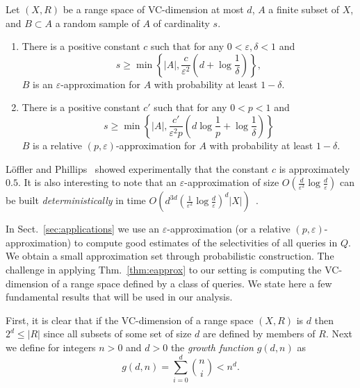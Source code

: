 \begin{theorem}\label{thm:eapprox}
Let $(X,R)$ be a range space of VC-dimension at most $d$,  $A$ a finite subset of $X$, and $B\subset
  A$ a random sample of $A$ of cardinality $s$. 
  \begin{enumerate}
\item
  There is a positive constant $c$ such that for any 
  $0<\varepsilon,\delta<1$  and  
  \begin{equation}\label{eq:eapprox}
  s\ge\min\left\{|A|,\frac{c}{\varepsilon^2}\left(d+\log\frac{1}{\delta}\right)\right\},
  \end{equation}  $B$ is an $\varepsilon$-approximation for $A$ with probability at least $1-\delta$.
\item
There is a positive constant $c'$ such that for any $0<p<1$ and
  $$s\ge\min\left\{|A|,\frac{c'}{\varepsilon^2p}\left(d\log{\frac{1}{p}}+\log\frac{1}{\delta}\right)\right\}$$
  $B$ is a relative
  $(p,\varepsilon)$-approximation for $A$ with probability at least $1-\delta$.
  \end{enumerate}
\end{theorem}

L\"offler and Phillips~\citeyearpar{LofflerP09} showed experimentally that the constant
$c$ is approximately $0.5$. It is also interesting to note that an
$\varepsilon$-approximation of size
$O(\frac{d}{\varepsilon^2}\log{\frac{d}{\varepsilon}})$ can be built
\emph{deterministically} in time
$O(d^{3d}(\frac{1}{\varepsilon^2}\log{\frac{d}{\varepsilon}})^d|X|)$~\citep{Chazelle00}.

In Sect.~\ref{sec:applications} we use an
$\varepsilon$-approximation (or a relative $(p,\varepsilon)$-approximation)  to
compute good estimates of the selectivities of all queries in $Q$. We obtain a
small approximation set through probabilistic construction.
The challenge in applying Thm.~\ref{thm:eapprox} to our setting is computing the
VC-dimension of a range space defined by a class of queries. 
We state here a few fundamental results that will be used in our analysis. 

First, it is
clear that if the VC-dimension of a range space $(X,R)$ is $d$ then $2^d\leq
|R|$ since all subsets of some set of size $d$ are defined by members of $R$.
Next we define for integers $n>0$ and $d>0$ the {\em growth function}
$g(d,n)$ as
  \[
  g(d,n)=\sum_{i=0}^d\binom{n}{i} < n^d .\]

